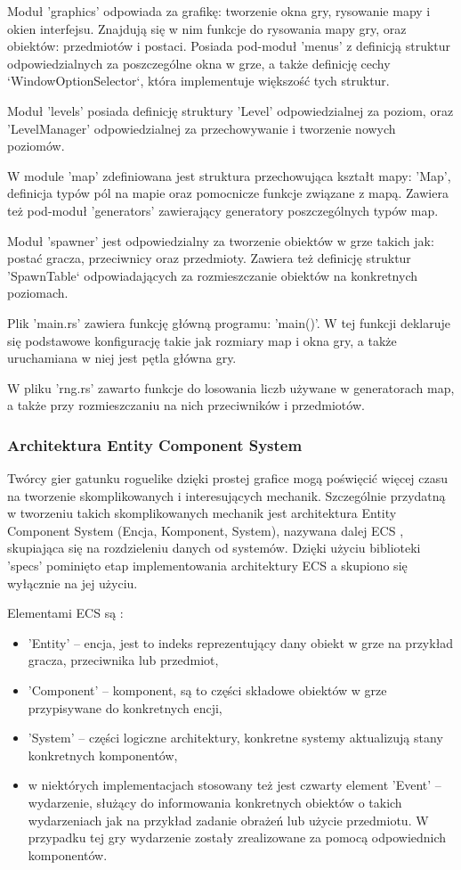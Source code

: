 \documentclass[12pt,twoside]{article}
\begin{document}
Moduł 'graphics' odpowiada za grafikę: tworzenie okna gry, rysowanie mapy i okien interfejsu. Znajdują się w nim funkcje do rysowania mapy gry, oraz obiektów: przedmiotów i postaci. Posiada pod-moduł 'menus' z definicją struktur odpowiedzialnych za poszczególne okna w grze, a także definicję cechy `WindowOptionSelector`, która implementuje większość tych struktur.

Moduł 'levels' posiada definicję struktury 'Level' odpowiedzialnej za poziom, oraz 'LevelManager' odpowiedzialnej za przechowywanie i tworzenie nowych poziomów.

W module 'map' zdefiniowana jest struktura przechowująca kształt mapy: 'Map', definicja typów pól na mapie oraz pomocnicze funkcje związane z mapą. Zawiera też pod-moduł 'generators' zawierający generatory poszczególnych typów map.

Moduł 'spawner' jest odpowiedzialny za tworzenie obiektów w grze takich jak: postać gracza, przeciwnicy oraz przedmioty. Zawiera też definicję struktur 'SpawnTable` odpowiadających za rozmieszczanie obiektów na konkretnych poziomach.

Plik 'main.rs' zawiera funkcję główną programu: 'main()'. W tej funkcji deklaruje się podstawowe konfigurację takie jak rozmiary map i okna gry, a także uruchamiana w niej jest pętla główna gry.
 
W pliku 'rng.rs' zawarto funkcje do losowania liczb używane w generatorach map, a także przy rozmieszczaniu na nich przeciwników i przedmiotów.

\subsubsection{Architektura Entity Component System}
Twórcy gier gatunku roguelike dzięki prostej grafice mogą poświęcić więcej czasu na tworzenie skomplikowanych i interesujących mechanik. Szczególnie przydatną w tworzeniu takich skomplikowanych mechanik jest architektura Entity Component System (Encja, Komponent, System), nazywana dalej ECS \cite{ecs_source}, skupiająca się na rozdzieleniu danych od systemów. Dzięki użyciu biblioteki 'specs' pominięto etap implementowania architektury ECS a skupiono się wyłącznie na jej użyciu.

Elementami ECS są :
\begin{itemize}
	\item 'Entity' -- encja, jest to indeks reprezentujący dany obiekt w grze na przykład gracza, przeciwnika lub przedmiot,
	\item 'Component' -- komponent, są to części składowe obiektów w grze przypisywane do konkretnych encji,
	\item 'System' -- części logiczne architektury, konkretne systemy aktualizują stany konkretnych komponentów,
	\item w niektórych implementacjach stosowany też jest czwarty element 'Event' -- wydarzenie, służący do informowania konkretnych obiektów o takich wydarzeniach jak na przykład zadanie obrażeń lub użycie przedmiotu. W przypadku tej gry wydarzenie zostały zrealizowane za pomocą odpowiednich komponentów.
\end{itemize}
	
\end{document}
